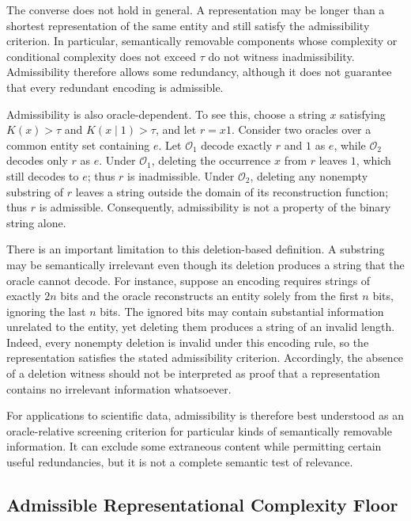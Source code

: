 The converse does not hold in general. A representation may be longer than a shortest representation of the same entity and still satisfy the admissibility criterion. In particular, semantically removable components whose complexity or conditional complexity does not exceed $\tau$ do not witness inadmissibility. Admissibility therefore allows some redundancy, although it does not guarantee that every redundant encoding is admissible.

Admissibility is also oracle-dependent. To see this, choose a string $x$ satisfying $K(x)>\tau$ and $K(x\mid 1)>\tau$, and let $r=x1$. Consider two oracles over a common entity set containing $e$. Let $\mathcal O_1$ decode exactly $r$ and $1$ as $e$, while $\mathcal O_2$ decodes only $r$ as $e$. Under $\mathcal O_1$, deleting the occurrence $x$ from $r$ leaves $1$, which still decodes to $e$; thus $r$ is inadmissible. Under $\mathcal O_2$, deleting any nonempty substring of $r$ leaves a string outside the domain of its reconstruction function; thus $r$ is admissible. Consequently, admissibility is not a property of the binary string alone.

There is an important limitation to this deletion-based definition. A substring may be semantically irrelevant even though its deletion produces a string that the oracle cannot decode. For instance, suppose an encoding requires strings of exactly $2n$ bits and the oracle reconstructs an entity solely from the first $n$ bits, ignoring the last $n$ bits. The ignored bits may contain substantial information unrelated to the entity, yet deleting them produces a string of an invalid length. Indeed, every nonempty deletion is invalid under this encoding rule, so the representation satisfies the stated admissibility criterion. Accordingly, the absence of a deletion witness should not be interpreted as proof that a representation contains no irrelevant information whatsoever.

For applications to scientific data, admissibility is therefore best understood as an oracle-relative screening criterion for particular kinds of semantically removable information. It can exclude some extraneous content while permitting certain useful redundancies, but it is not a complete semantic test of relevance.

\subsection*{Admissible Representational Complexity Floor}

